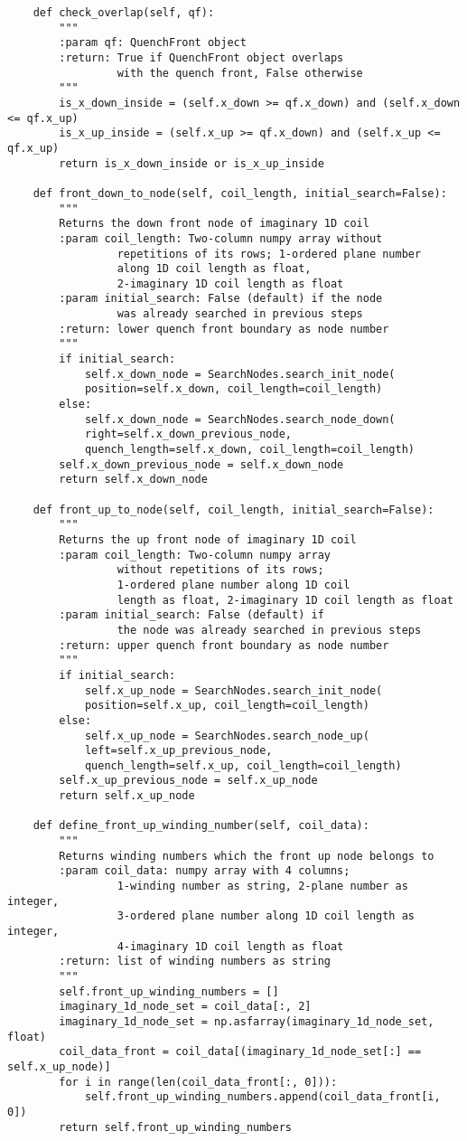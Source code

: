 \begin{verbatim}
    def check_overlap(self, qf):
        """
        :param qf: QuenchFront object
        :return: True if QuenchFront object overlaps 
                 with the quench front, False otherwise
        """
        is_x_down_inside = (self.x_down >= qf.x_down) and (self.x_down <= qf.x_up)
        is_x_up_inside = (self.x_up >= qf.x_down) and (self.x_up <= qf.x_up)
        return is_x_down_inside or is_x_up_inside

    def front_down_to_node(self, coil_length, initial_search=False):
        """
        Returns the down front node of imaginary 1D coil
        :param coil_length: Two-column numpy array without 
                 repetitions of its rows; 1-ordered plane number 
                 along 1D coil length as float, 
                 2-imaginary 1D coil length as float
        :param initial_search: False (default) if the node 
                 was already searched in previous steps
        :return: lower quench front boundary as node number
        """
        if initial_search:
            self.x_down_node = SearchNodes.search_init_node(
            position=self.x_down, coil_length=coil_length)
        else:
            self.x_down_node = SearchNodes.search_node_down(
            right=self.x_down_previous_node, 
            quench_length=self.x_down, coil_length=coil_length)
        self.x_down_previous_node = self.x_down_node
        return self.x_down_node

    def front_up_to_node(self, coil_length, initial_search=False):
        """
        Returns the up front node of imaginary 1D coil
        :param coil_length: Two-column numpy array 
                 without repetitions of its rows;
                 1-ordered plane number along 1D coil 
                 length as float, 2-imaginary 1D coil length as float
        :param initial_search: False (default) if 
                 the node was already searched in previous steps
        :return: upper quench front boundary as node number
        """
        if initial_search:
            self.x_up_node = SearchNodes.search_init_node(
            position=self.x_up, coil_length=coil_length)
        else:
            self.x_up_node = SearchNodes.search_node_up(
            left=self.x_up_previous_node, 
            quench_length=self.x_up, coil_length=coil_length)
        self.x_up_previous_node = self.x_up_node
        return self.x_up_node

    def define_front_up_winding_number(self, coil_data):
        """
        Returns winding numbers which the front up node belongs to
        :param coil_data: numpy array with 4 columns; 
                 1-winding number as string, 2-plane number as integer,
                 3-ordered plane number along 1D coil length as integer, 
                 4-imaginary 1D coil length as float
        :return: list of winding numbers as string
        """
        self.front_up_winding_numbers = []
        imaginary_1d_node_set = coil_data[:, 2]
        imaginary_1d_node_set = np.asfarray(imaginary_1d_node_set, float)
        coil_data_front = coil_data[(imaginary_1d_node_set[:] == self.x_up_node)]
        for i in range(len(coil_data_front[:, 0])):
            self.front_up_winding_numbers.append(coil_data_front[i, 0])
        return self.front_up_winding_numbers


\end{verbatim}
